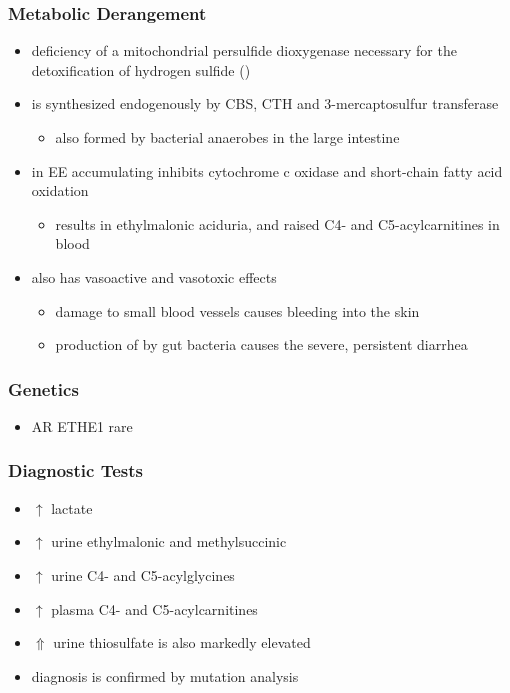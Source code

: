 \documentclass{scrartcl}
\begin{document}
\subsubsection{Metabolic Derangement}
\label{sec:org1c85b04}
\begin{itemize}
\item deficiency of a mitochondrial persulfide dioxygenase necessary for the
detoxification of hydrogen sulfide ()
\item {} is synthesized endogenously by CBS, CTH and
3-mercaptosulfur transferase
\begin{itemize}
\item also formed by bacterial anaerobes in the large intestine
\end{itemize}
\item in EE accumulating  inhibits cytochrome c oxidase and
short-chain fatty acid oxidation
\begin{itemize}
\item results in ethylmalonic aciduria, and raised C4- and
C5-acylcarnitines in blood
\end{itemize}
\item {} also has vasoactive and vasotoxic effects
\begin{itemize}
\item damage to small blood vessels causes bleeding into the
skin
\item production of  by gut bacteria causes the severe, persistent diarrhea
\end{itemize}
\end{itemize}

\subsubsection{Genetics}
\label{sec:org8dcf464}
\begin{itemize}
\item AR ETHE1 rare
\end{itemize}

\subsubsection{Diagnostic Tests}
\label{sec:orgf16575a}
\begin{itemize}
\item \(\uparrow\) lactate
\item \(\uparrow\) urine ethylmalonic and methylsuccinic
\item \(\uparrow\) urine C4- and C5-acylglycines
\item \(\uparrow\) plasma C4- and C5-acylcarnitines
\item \(\Uparrow\) urine thiosulfate is also markedly elevated
\item diagnosis is confirmed by mutation analysis
\end{itemize}
\end{document}
